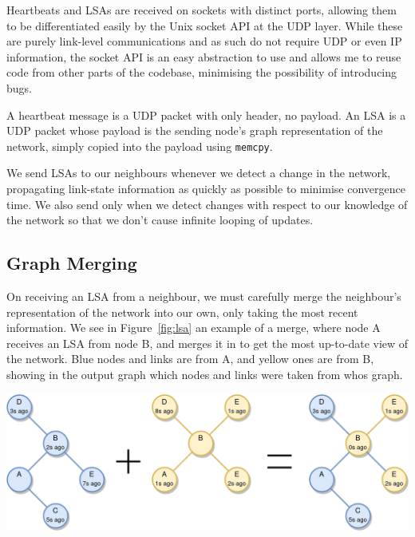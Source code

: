 \documentclass[withindex,glossary,openany]{cam-thesis}
\begin{document}
Heartbeats and LSAs are received on sockets with distinct ports, allowing them to be differentiated easily by the Unix socket API at the UDP layer. While these are purely link-level communications and as such do not require UDP or even IP information, the socket API is an easy abstraction to use and allows me to reuse code from other parts of the codebase, minimising the possibility of introducing bugs.

A heartbeat message is a UDP packet with only header, no payload. An LSA is a UDP packet whose payload is the sending node's graph representation of the network, simply copied into the payload using \texttt{memcpy}.

We send LSAs to our neighbours whenever we detect a change in the network, propagating link-state information as quickly as possible to minimise convergence time. We also send only when we detect changes with respect to our knowledge of the network so that we don't cause infinite looping of updates.

\subsection{Graph Merging}

On receiving an LSA from a neighbour, we must carefully merge the neighbour's representation of the network into our own, only taking the most recent information. We see in Figure~\ref{fig:lsa} an example of a merge, where node A receives an LSA from node B, and merges it in to get the most up-to-date view of the network. Blue nodes and links are from A, and yellow ones are from B, showing in the output graph which nodes and links were taken from whos graph.

\begin{center}
\begin{minipage}{0.9\textwidth} \centering
	\includegraphics[width=1\textwidth]{lsa}
	\label{fig:lsa}
\end{minipage}
\end{center}
\end{document}
